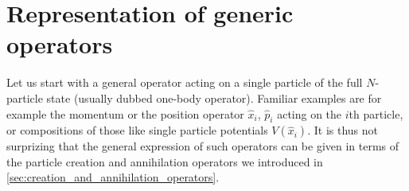 \section{Representation of generic operators}
\label{sec:representation_of_generic_operators}
Let us start with a general operator acting on a single particle of the full $N$-particle state (usually dubbed one-body operator).
Familiar examples are for example the momentum or the position operator $\hat x_i$, $\hat p_i$ acting on the $i$th particle, or compositions of those like single particle potentials $V(\hat x_i)$.
It is thus not surprizing that the general expression of such operators can be given in terms of the particle creation and annihilation operators we introduced in \cref{sec:creation_and_annihilation_operators}.
\\

